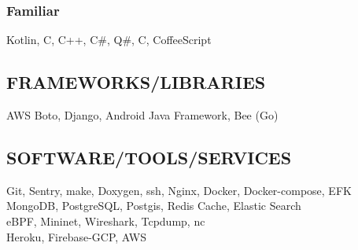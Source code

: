\documentclass[letterpaper]{deedy-resume} %
\begin{document}
\begin{minipage}[t]{0.33\textwidth}
\subsubsection*{Familiar}
\squeezeup
Kotlin, C, C++, C\#, Q\#, C, CoffeeScript

\sectionspace %

\subsection{FRAMEWORKS/LIBRARIES}
AWS Boto, Django, Android Java Framework, Bee (Go)

\sectionspace %

\subsection{SOFTWARE/TOOLS/SERVICES}
Git, Sentry, make, Doxygen, ssh, Nginx, Docker, Docker-compose, EFK \\
MongoDB, PostgreSQL, Postgis, Redis Cache, Elastic Search \\
eBPF, Mininet, Wireshark, Tcpdump, nc \\
Heroku, Firebase-GCP, AWS \\


\sectionspace %





\end{minipage}
\end{document}
